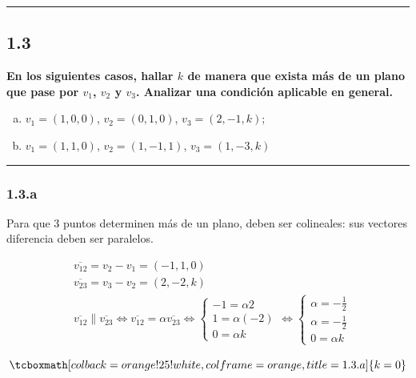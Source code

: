 \documentclass{article}
\begin{document}
\hrule
\vspace{10 pt}

\subsection*{1.3}
\label{subsec:1.3}

\textbf{En los siguientes casos, hallar $k$ de manera que exista más de un plano que pase por $v_1$, $v_2$ y $v_3$. Analizar una condición aplicable en general.} 

\begin{enumerate}[(a)]
\bfseries
\item $v_1 = (1, 0, 0)$, $v_2=(0, 1, 0)$, $v_3 = (2, -1, k)$;

\item $v_1 = (1, 1, 0)$, $v_2=(1, -1, 1)$, $v_3 = (1, -3, k)$
\end{enumerate}
\hrule

\subsubsection*{1.3.a}
\label{subsubsec:1.3.a}

Para que 3 puntos determinen más de un plano, deben ser colineales: sus vectores diferencia deben ser paralelos.

\begin{subequations}
\begin{align}
& \overline{v_{12}} = v_2 - v_1 = (-1, 1, 0) \\
& \overline{v_{23}} = v_3 - v_2 = (2, -2, k) \\
& \overline{v_{12}} \parallel \overline{v_{23}} \Leftrightarrow \overline{v_{12}} = \alpha \overline{v_{23}} \Leftrightarrow \left\{ \begin{array}{ll}
-1 = \alpha 2 \\
1 = \alpha (-2) \\
0 = \alpha k
\end{array} \right. \Leftrightarrow \left\{ \begin{array}{ll}
\alpha = -\frac{1}{2} \\
\alpha = -\frac{1}{2} \\
0 = \alpha k
\end{array} \right.
\end{align}
\end{subequations}

\begin{equation}
\tcboxmath[colback=orange!25!white,colframe=orange,title=1.3.a]
{ k = 0 }
\end{equation}
\end{document}
